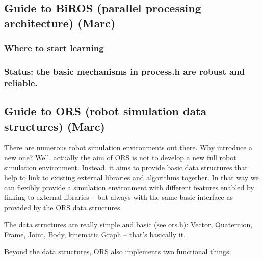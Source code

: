 \subsection{Guide to BiROS (parallel processing architecture) (Marc)}


\subsubsection{Where to start learning}


\subsubsection{Status: the basic mechanisms in process.h are robust and reliable. }

\subsection{Guide to ORS (robot simulation data structures) (Marc)}

There are numerous robot simulation environments out there. Why
introduce a new one? Well, actually the aim of ORS is not to develop a
new full robot simulation environment. Instead, it aims to provide
basic data structures that help to link to existing external libraries
and algorithms together. In that way we can flexibly provide a
simulation environment with different features enabled by linking to
external libraries -- but always with the same basic interface as
provided by the ORS data structures.

The data structures are really simple and basic (see ors.h): Vector, Quaternion, Frame, Joint, Body, kinematic Graph -- that's basically it.

Beyond the data structures, ORS also implements two functional things:

